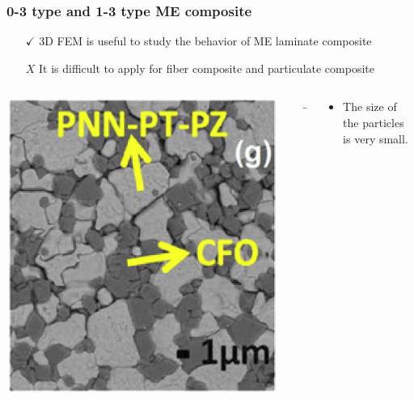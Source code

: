 \documentclass[compress]{beamer}
\begin{document}
\begin{frame}\frametitle{0-3 type and 1-3 type ME composite}
\begin{itemize}[]
	\item[{\color{green} $\checkmark$}] 3D FEM is useful to study the behavior of ME laminate composite
	\item[{\color{red} $X$}] It is difficult to apply for fiber composite and particulate composite
	\end{itemize}

\begin{columns}[totalwidth=\textwidth]
   \begin{column}{.30\textwidth}
   \includegraphics[width=0.99\textwidth]{Graphic/04_realimage}
   \end{column}
   \begin{column}{.05\textwidth}
   {\color{red} \Large$\mathbf{\boldsymbol{\rightarrow}}$}
   \end{column}
   \begin{column}{.65\textwidth}
   \begin{itemize}[label=$\bullet$, font=\small, leftmargin=*]
	\item The size of the particles is very small.

\end{itemize}
\end{column}
\end{columns}
\end{frame}
\end{document}
